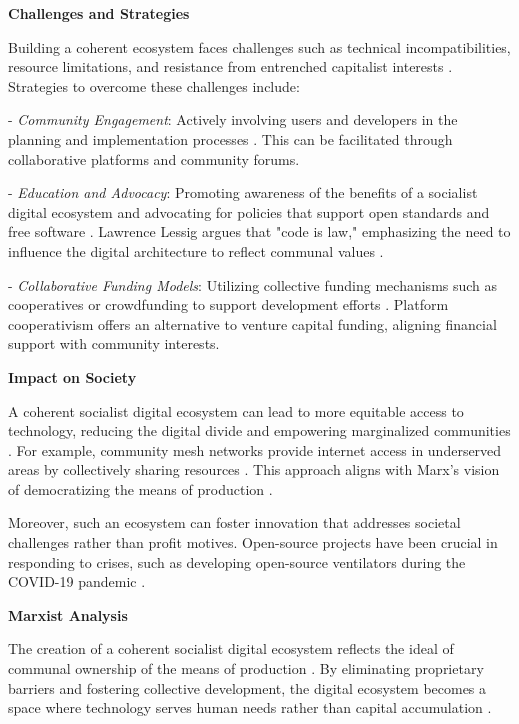 \begin{refsection}
\textbf{Challenges and Strategies}

Building a coherent ecosystem faces challenges such as technical incompatibilities, resource limitations, and resistance from entrenched capitalist interests \cite[pp.~73-74]{Stallman2010}. Strategies to overcome these challenges include:

- \textit{Community Engagement}: Actively involving users and developers in the planning and implementation processes \cite[pp.~156-158]{Weber2005}. This can be facilitated through collaborative platforms and community forums.

- \textit{Education and Advocacy}: Promoting awareness of the benefits of a socialist digital ecosystem and advocating for policies that support open standards and free software \cite[pp.~62-64]{Lessig2006}. Lawrence Lessig argues that "code is law," emphasizing the need to influence the digital architecture to reflect communal values \cite[pp.~5]{Lessig2006}.

- \textit{Collaborative Funding Models}: Utilizing collective funding mechanisms such as cooperatives or crowdfunding to support development efforts \cite[pp.~89-91]{Scholz2016}. Platform cooperativism offers an alternative to venture capital funding, aligning financial support with community interests.

\textbf{Impact on Society}

A coherent socialist digital ecosystem can lead to more equitable access to technology, reducing the digital divide and empowering marginalized communities \cite[pp.~120-122]{Fuchs2014}. For example, community mesh networks provide internet access in underserved areas by collectively sharing resources \cite[pp.~25-27]{Nemer2015}. This approach aligns with Marx's vision of democratizing the means of production \cite[pp.~477-478]{Marx2008}.

Moreover, such an ecosystem can foster innovation that addresses societal challenges rather than profit motives. Open-source projects have been crucial in responding to crises, such as developing open-source ventilators during the COVID-19 pandemic \cite[pp.~33-35]{Pearce2020}.

\textbf{Marxist Analysis}

The creation of a coherent socialist digital ecosystem reflects the ideal of communal ownership of the means of production \cite[pp.~172-173]{Marx2008}. By eliminating proprietary barriers and fostering collective development, the digital ecosystem becomes a space where technology serves human needs rather than capital accumulation \cite[pp.~477-478]{Marx2008}.


\end{refsection}

